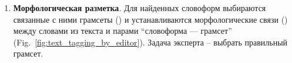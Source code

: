 \begin{enumerate}
\item \textbf{Морфологическая разметка}. 
Для найденных словоформ выбираются связанные с ними грамсеты  () и устанавливаются морфологические связи () между словами из текста и парами ``словоформа — грамсет'' (Fig.~\ref{fig:text_tagging_by_editor}). 
Задача эксперта -- выбрать правильный грамсет.


\end{enumerate}

